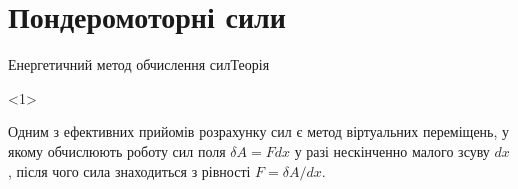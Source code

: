 \documentclass[onlytextwidth]{beamer}
\begin{document}


\section{Пондеромоторні сили}


\begin{frame}{Енергетичний метод обчислення сил}{Теорія}
	\begin{onlyenv}
		\begin{block}{}\justifying
			Одним з ефективних прийомів розрахунку сил є \alert{метод віртуальних переміщень}, у якому
			обчислюють роботу сил поля $\delta A = F dx$ у разі нескінченно малого зсуву $dx$, після
			чого сила знаходиться з рівності $ F = \delta A / dx $.

			\bigskip


\end{block}
\end{onlyenv}
\end{frame}
\end{document}
